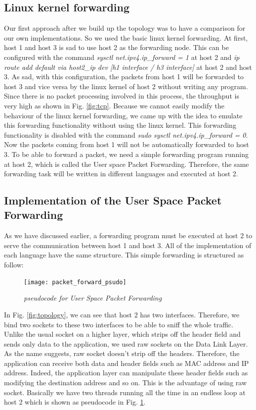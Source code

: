 \subsection{Linux kernel forwarding}
Our first approach after we build up the topology was to have a comparison for our own implementations. So we used the basic linux kernel forwarding.\newline 
At first, host 1 and host 3 is sad to use host 2 as the forwarding node. This can be configured with the command \textit{sysctl net.ipv4.ip\_forward = 1} at host 2 and \textit{ip route add default via host2\_ip dev [h1 interface / h3 interface]} at host 2 and host 3. As sad, with this configuration, the packets from host 1 will be forwarded to host 3 and vice versa by the linux kernel of host 2 without writing any program. Since there is no packet processing involved in this process, the throughput is very high as shown in Fig. \ref{fig:tcp}. Because we cannot easily modify the behaviour of the linux kernel forwarding, we came up with the idea to emulate this forwarding functionality without using the linux kernel. This forwarding functionality is disabled with the command \textit{sudo sysctl net.ipv4.ip\_forward = 0}. Now the packets coming from host 1 will not be automatically forwarded to host 3. To be able to forward a packet, we need a simple forwarding program running at host 2, which is called the User space Packet Forwarding. Therefore, the same forwarding task will be written in different languages and executed at host 2.

\subsection{Implementation of the User Space Packet Forwarding}
As we have discussed earlier, a forwarding program must be executed at host 2 to serve the communication between host 1 and host 3. All of the implementation of each language have the same structure. This simple forwarding is structured as follow: \newline

\begin{figure}[htbp]
\centering
\texttt{[image: packet\_forward\_psudo]}
\caption{\em pseudocode for User Space Packet Forwarding}
\label{fig:pseudocode_packet_forwarding}
\end{figure}
In Fig. \ref{fig:topology}, we can see that host 2 has two interfaces. Therefore, we bind two sockets to these two interfaces to be able to sniff the whole traffic. Unlike the usual socket on a higher layer, which strips off the header field and sends only data to the application, we used raw sockets on the Data Link Layer. As the name suggests, raw socket doesn't strip off the headers. Therefore, the application can receive both data and header fields such as MAC address and IP address. Indeed, the application layer can manipulate these header fields such as modifying the destination address and so on. This is the advantage of using raw socket. Basically we have two threads running all the time in an endless loop at host 2 which is shown as pseudocode in Fig. \ref{fig:pseudocode_packet_forwarding}.

